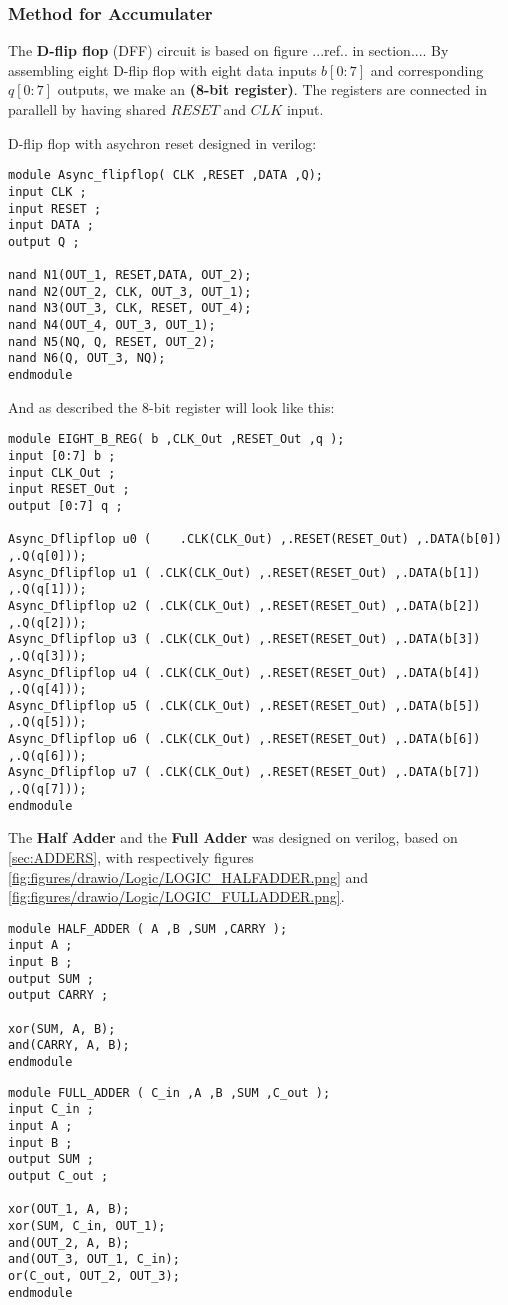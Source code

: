 \subsubsection{Method for Accumulater}

The \textbf{D-flip flop} (DFF) circuit is based on figure ...ref.. in section.... By assembling eight D-flip flop with eight data inputs $b[0:7]$ and corresponding $q[0:7]$ outputs, we make an \textbf{(8-bit register)}. The registers are connected in parallell by having shared $RESET$ and $CLK$ input. 

D-flip flop with asychron reset designed in verilog:
\begin{lstlisting}
module Async_flipflop( CLK ,RESET ,DATA ,Q);
input CLK ;
input RESET ;
input DATA ;
output Q ;

nand N1(OUT_1, RESET,DATA, OUT_2);
nand N2(OUT_2, CLK, OUT_3, OUT_1);
nand N3(OUT_3, CLK, RESET, OUT_4);
nand N4(OUT_4, OUT_3, OUT_1);
nand N5(NQ, Q, RESET, OUT_2);
nand N6(Q, OUT_3, NQ);
endmodule
\end{lstlisting}
And as described the 8-bit register will look like this:

\begin{lstlisting}
module EIGHT_B_REG( b ,CLK_Out ,RESET_Out ,q );
input [0:7] b ;
input CLK_Out ;
input RESET_Out ;
output [0:7] q ;

Async_Dflipflop u0 (	.CLK(CLK_Out) ,.RESET(RESET_Out) ,.DATA(b[0]) ,.Q(q[0])); 
Async_Dflipflop u1 ( .CLK(CLK_Out) ,.RESET(RESET_Out) ,.DATA(b[1]) ,.Q(q[1]));
Async_Dflipflop u2 ( .CLK(CLK_Out) ,.RESET(RESET_Out) ,.DATA(b[2]) ,.Q(q[2]));
Async_Dflipflop u3 ( .CLK(CLK_Out) ,.RESET(RESET_Out) ,.DATA(b[3]) ,.Q(q[3]));
Async_Dflipflop u4 ( .CLK(CLK_Out) ,.RESET(RESET_Out) ,.DATA(b[4]) ,.Q(q[4]));
Async_Dflipflop u5 ( .CLK(CLK_Out) ,.RESET(RESET_Out) ,.DATA(b[5]) ,.Q(q[5]));
Async_Dflipflop u6 ( .CLK(CLK_Out) ,.RESET(RESET_Out) ,.DATA(b[6]) ,.Q(q[6]));
Async_Dflipflop u7 ( .CLK(CLK_Out) ,.RESET(RESET_Out) ,.DATA(b[7]) ,.Q(q[7]));
endmodule
\end{lstlisting}

The \textbf{Half Adder} and the \textbf{Full Adder} was designed on verilog, based on \ref{sec:ADDERS}, with respectively figures \ref{fig:figures/drawio/Logic/LOGIC_HALFADDER.png} and \ref{fig:figures/drawio/Logic/LOGIC_FULLADDER.png}.
\begin{lstlisting}
module HALF_ADDER ( A ,B ,SUM ,CARRY );
input A ;
input B ;
output SUM ;
output CARRY ;

xor(SUM, A, B);
and(CARRY, A, B);
endmodule
\end{lstlisting}
\begin{lstlisting}
module FULL_ADDER ( C_in ,A ,B ,SUM ,C_out );
input C_in ;
input A ;
input B ;
output SUM ;
output C_out ;

xor(OUT_1, A, B);
xor(SUM, C_in, OUT_1);
and(OUT_2, A, B);
and(OUT_3, OUT_1, C_in);
or(C_out, OUT_2, OUT_3);
endmodule
\end{lstlisting}

